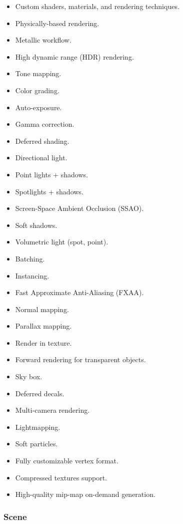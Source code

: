 \documentclass[
]{book}
\providecommand{\tightlist}{%
  \setlength{\itemsep}{0pt}\setlength{\parskip}{0pt}}
\theoremstyle{definition}
\theoremstyle{definition}
\theoremstyle{definition}
\theoremstyle{definition}
\theoremstyle{remark}
\begin{document}
\begin{itemize}
\tightlist
\item
  Custom shaders, materials, and rendering techniques.
\item
  Physically-based rendering.
\item
  Metallic workflow.
\item
  High dynamic range (HDR) rendering.
\item
  Tone mapping.
\item
  Color grading.
\item
  Auto-exposure.
\item
  Gamma correction.
\item
  Deferred shading.
\item
  Directional light.
\item
  Point lights + shadows.
\item
  Spotlights + shadows.
\item
  Screen-Space Ambient Occlusion (SSAO).
\item
  Soft shadows.
\item
  Volumetric light (spot, point).
\item
  Batching.
\item
  Instancing.
\item
  Fast Approximate Anti-Aliasing (FXAA).
\item
  Normal mapping.
\item
  Parallax mapping.
\item
  Render in texture.
\item
  Forward rendering for transparent objects.
\item
  Sky box.
\item
  Deferred decals.
\item
  Multi-camera rendering.
\item
  Lightmapping.
\item
  Soft particles.
\item
  Fully customizable vertex format.
\item
  Compressed textures support.
\item
  High-quality mip-map on-demand generation.
\end{itemize}

\subsubsection{Scene}\label{scene}
\end{document}

